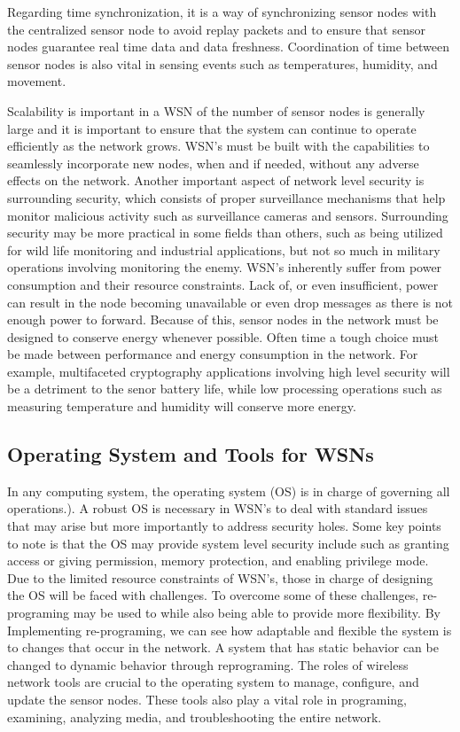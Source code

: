 \smallskip

Regarding time synchronization, it is a way of synchronizing sensor nodes with the centralized sensor node to avoid replay packets and to ensure that sensor nodes guarantee real time data and data freshness. Coordination of time between sensor nodes is also vital in sensing events such as temperatures, humidity, and movement. 

\smallskip

Scalability is important in a WSN of the number of sensor nodes is generally large and it is important to ensure that the system can continue to operate efficiently as the network grows. WSN’s must be built with the capabilities to seamlessly incorporate new nodes, when and if needed, without any adverse effects on the network. Another important aspect of network level security is surrounding security, which consists of proper surveillance mechanisms that help monitor malicious activity such as surveillance cameras and sensors. Surrounding security may be more practical in some fields than others, such as being utilized for wild life monitoring and industrial applications, but not so much in military operations involving monitoring the enemy. WSN’s inherently suffer from power consumption and their resource constraints. Lack of, or even insufficient, power can result in the node becoming unavailable or even drop messages as there is not enough power to forward. Because of this, sensor nodes in the network must be designed to conserve energy whenever possible. Often time a tough choice must be made between performance and energy consumption in the network. For example, multifaceted cryptography applications involving high level security will be a detriment to the senor battery life, while low processing operations such as measuring temperature and humidity will conserve more energy. 

\subsection {Operating System and Tools for WSNs} 
\smallskip

In any computing system, the operating system (OS) is in charge of governing all operations.). A robust OS is necessary in WSN’s to deal with standard issues that may arise but more importantly to address security holes. Some key points to note is that the OS may provide system level security include such as granting access or giving permission, memory protection, and enabling privilege mode. Due to the limited resource constraints of WSN’s, those in charge of designing the OS will be faced with challenges. To overcome some of these challenges, re-programing may be used to while also being able to provide more flexibility. By Implementing re-programing, we can see how adaptable and flexible the system is to changes that occur in the network. A system that has static behavior can be changed to dynamic behavior through reprograming. The roles of wireless network tools are crucial to the operating system to manage, configure, and update the sensor nodes. These tools also play a vital role in programing, examining, analyzing media, and troubleshooting the entire network. 

